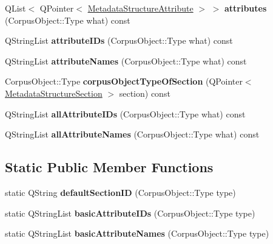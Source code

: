\begin{DoxyCompactItemize}
\item 
\mbox{\label{class_metadata_structure_a50ce49b8e857542673e191a6dbf62e90}} 
Q\+List$<$ Q\+Pointer$<$ \hyperlink{class_metadata_structure_attribute}{Metadata\+Structure\+Attribute} $>$ $>$ {\bfseries attributes} (Corpus\+Object\+::\+Type what) const
\item 
\mbox{\label{class_metadata_structure_a8b21891d36704de10f539eae0b99e3b4}} 
Q\+String\+List {\bfseries attribute\+I\+Ds} (Corpus\+Object\+::\+Type what) const
\item 
\mbox{\label{class_metadata_structure_ac0cbb00aa69a7da4716b99f7277f5c10}} 
Q\+String\+List {\bfseries attribute\+Names} (Corpus\+Object\+::\+Type what) const
\item 
\mbox{\label{class_metadata_structure_ab4afffe5f8a7a0af000042326a24fc1a}} 
Corpus\+Object\+::\+Type {\bfseries corpus\+Object\+Type\+Of\+Section} (Q\+Pointer$<$ \hyperlink{class_metadata_structure_section}{Metadata\+Structure\+Section} $>$ section) const
\item 
\mbox{\label{class_metadata_structure_a33ba1317870bd2a184ba795836fb4e5e}} 
Q\+String\+List {\bfseries all\+Attribute\+I\+Ds} (Corpus\+Object\+::\+Type what) const
\item 
\mbox{\label{class_metadata_structure_a421274cc36f8777b5c1ff8c236c7b7b6}} 
Q\+String\+List {\bfseries all\+Attribute\+Names} (Corpus\+Object\+::\+Type what) const
\end{DoxyCompactItemize}
\subsection*{Static Public Member Functions}
\begin{DoxyCompactItemize}
\item 
\mbox{\label{class_metadata_structure_a15b128d5d9602c1f790ec2ed0320eade}} 
static Q\+String {\bfseries default\+Section\+ID} (Corpus\+Object\+::\+Type type)
\item 
\mbox{\label{class_metadata_structure_ad20cb0bdcc2221422359140f30595cab}} 
static Q\+String\+List {\bfseries basic\+Attribute\+I\+Ds} (Corpus\+Object\+::\+Type type)
\item 
\mbox{\label{class_metadata_structure_ae277311d2247f5a990044b2f02ef0767}} 
static Q\+String\+List {\bfseries basic\+Attribute\+Names} (Corpus\+Object\+::\+Type type)
\end{DoxyCompactItemize}
